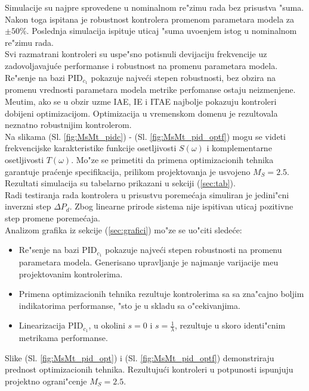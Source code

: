 \documentclass[a4paper,11pt]{article}
\theoremstyle{definition} \newtheorem{deff}{Definicija}[section]
\theoremstyle{definition} \newtheorem{prim}[deff]{Primer}
\theoremstyle{plain} \newtheorem{teor}[deff]{Teorema}
\begin{document}
	Simulacije su najpre sprovedene u nominalnom re"zimu rada bez prisustva "suma. Nakon toga ispitana je robustnost kontrolera promenom parametara modela za $\pm 50\%$. Poslednja simulacija ispituje uticaj "suma uvo\dj{}enjem istog u nominalnom re"zimu rada.\\
	
	Svi razmatrani kontroleri su uspe"sno potisnuli devijaciju frekvencije uz zadovoljavaju\'ce performanse i robustnost na promenu parametara modela. Re"senje na bazi PID$_{c_1}$ pokazuje najve\'ci stepen robustnosti, bez obzira na promenu vrednosti parametara modela metrike perfomanse ostaju neizmenjene. Me\dj{}utim, ako se u obzir uzme IAE, IE i ITAE najbolje pokazuju kontroleri dobijeni optimizacijom. Optimizacija u vremenskom domenu je rezultovala neznatno robustnijim kontrolerom.\\
	
	Na slikama (Sl. \ref{fig:MsMt_pidc}) - (Sl. \ref{fig:MsMt_pid_optf}) mogu se videti frekvencijske karakteristike funkcije osetljivosti $S(\omega)$ i komplementarne osetljivosti $T(\omega)$. Mo"ze se primetiti da primena optimizacionih tehnika garantuje pra\'cenje specifikacija, prilikom projektovanja je usvojeno $M_S = 2.5$.\\
	
	Rezultati simulacija su tabelarno prikazani u sekciji (\ref{sec:tab}).\\
	
	Radi testiranja rada kontrolera u prisustvu poreme\'caja simuliran je jedini"cni inverzni step $\Delta P_d$.  Zbog linearne prirode sistema nije ispitivan uticaj pozitivne step promene poreme\'caja. \\
	

	Analizom grafika iz sekcije (\ref{sec:grafici}) mo"ze se uo"citi slede\'ce:
	
	
	
	
	\begin{itemize}
		\item Re"senje na bazi PID$_{c_1}$ pokazuje najve\'ci stepen robustnosti na promenu parametara modela. Generisano upravljanje je najmanje varijacije me\dj{}u projektovanim kontrolerima.
		
		\item Primena optimizacionih tehnika rezultuje kontrolerima sa sa zna"cajno boljim indikatorima performanse, "sto je u skladu sa o"cekivanjima.
		
		\item Linearizacija PID$_{c_1}$, u okolini $s = 0$ i  $s = \frac{1}{\lambda}$, rezultuje u skoro identi"cnim metrikama performanse. 
	\end{itemize} \vspace{0.5 cm}	
	Slike (Sl. \ref{fig:MsMt_pid_opt}) i  (Sl. \ref{fig:MsMt_pid_optf}) demonstriraju prednost optimizacionih tehnika. Rezultuju\'ci kontroleri u potpunosti ispunjuju projektno ograni"cenje $M_S = 2.5$.
	
\end{document}
